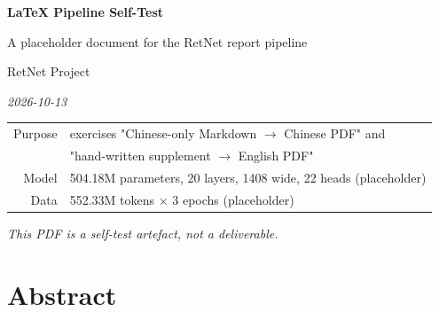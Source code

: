 \thispagestyle{empty}

\begin{center}
\vspace*{3.2cm}

{\LARGE\bfseries LaTeX Pipeline Self-Test}

\vspace{0.55cm}

{\large A placeholder document for the RetNet report pipeline}

\vspace{1.1cm}

{\normalsize RetNet Project}

\vspace{0.25cm}

{\small\itshape 2026-10-13}

\vspace{2.2cm}

\begin{minipage}{0.80\textwidth}
\centering\small
\begin{tabular}{@{}rl@{}}
\toprule
Purpose & exercises "Chinese-only Markdown $\rightarrow$ Chinese PDF" and \\
        & "hand-written supplement $\rightarrow$ English PDF" \\
Model & 504.18M parameters, 20 layers, 1408 wide, 22 heads (placeholder) \\
Data & 552.33M tokens $\times$ 3 epochs (placeholder) \\
\bottomrule
\end{tabular}
\end{minipage}

\vfill

{\small\itshape This PDF is a self-test artefact, not a deliverable.}

\vspace{1.2cm}
\end{center}

\clearpage

\section*{Abstract}

